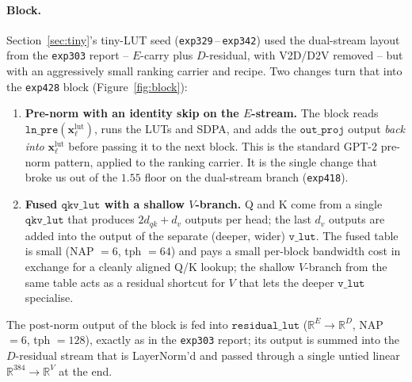 \documentclass[11pt]{article}
\begin{document}
\paragraph{Block.}
Section~\ref{sec:tiny}'s tiny-LUT seed (\texttt{exp329}\,--\,\texttt{exp342}) used the dual-stream layout from the \texttt{exp303} report -- $E$-carry plus $D$-residual, with V2D/D2V removed -- but with an aggressively small ranking carrier and recipe.
Two changes turn that into the \texttt{exp428} block (Figure~\ref{fig:block}):
\begin{enumerate}[itemsep=1pt, topsep=2pt]
    \item \textbf{Pre-norm with an identity skip on the $E$-stream.} The block reads $\mathtt{ln\_pre}(\mathbf{x}^{\text{lut}}_\ell)$, runs the LUTs and SDPA, and adds the $\mathtt{out\_proj}$ output \emph{back into} $\mathbf{x}^{\text{lut}}_\ell$ before passing it to the next block. This is the standard GPT-2 pre-norm pattern, applied to the ranking carrier. It is the single change that broke us out of the $1.55$ floor on the dual-stream branch (\texttt{exp418}).
    \item \textbf{Fused $\mathtt{qkv\_lut}$ with a shallow $V$-branch.} Q and K come from a single $\mathtt{qkv\_lut}$ that produces $2d_{qk} + d_v$ outputs per head; the last $d_v$ outputs are added into the output of the separate (deeper, wider) $\mathtt{v\_lut}$. The fused table is small (NAP $= 6$, tph $= 64$) and pays a small per-block bandwidth cost in exchange for a cleanly aligned Q/K lookup; the shallow $V$-branch from the same table acts as a residual shortcut for $V$ that lets the deeper $\mathtt{v\_lut}$ specialise.
\end{enumerate}
The post-norm output of the block is fed into $\mathtt{residual\_lut}$ ($\mathbb{R}^E \to \mathbb{R}^D$, NAP $= 6$, tph $= 128$), exactly as in the \texttt{exp303} report; its output is summed into the $D$-residual stream that is LayerNorm'd and passed through a single untied linear $\mathbb{R}^{384} \to \mathbb{R}^{V}$ at the end.
\end{document}
